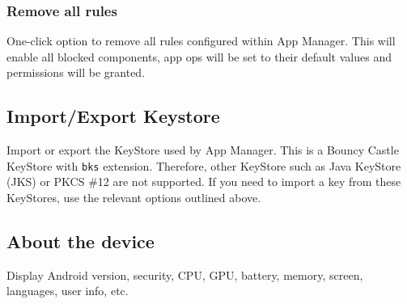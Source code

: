 \subsubsection{Remove all rules} %
One-click option to remove all rules configured within App Manager.
This will enable all blocked components, app ops will be set to their default values and permissions will be granted.

\subsection{Import/Export Keystore}\label{subsec:import/export-keystore} %
Import or export the KeyStore used by App Manager.
This is a Bouncy Castle KeyStore with \texttt{bks} extension.
Therefore, other KeyStore such as Java KeyStore (JKS) or PKCS \#12 are not supported.
If you need to import a key from these KeyStores, use the relevant options outlined above.

\subsection{About the device}\label{subsec:device-info} %
Display Android version, security, CPU, GPU, battery, memory, screen, languages, user info, etc.
